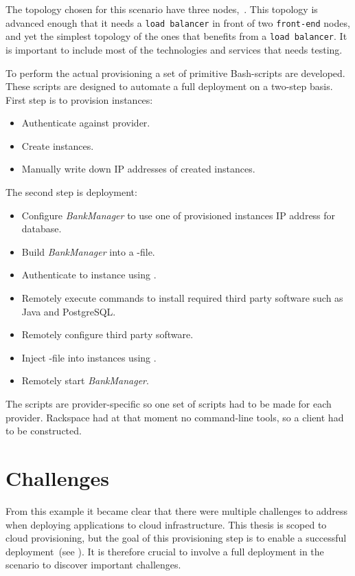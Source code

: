 The topology chosen for this scenario have three nodes,~.
This topology is advanced enough that it needs a \texttt{load balancer} in front of two
\texttt{front-end} nodes, and yet the simplest topology of the ones that benefits from a \texttt{load balancer}.
It is important to include most of the technologies and services that needs testing.

To perform the actual provisioning a set of primitive Bash-scripts are developed.
These scripts are designed to automate a full deployment on a two-step basis.
First step is to provision instances:
\begin{itemize}
  \item Authenticate against provider.
  \item Create instances.
  \item Manually write down IP addresses of created instances.
\end{itemize}
The second step is deployment:
\begin{itemize}
  \item Configure \emph{BankManager} to use one of provisioned instances IP address for database.
  \item Build \emph{BankManager} into a -file.
  \item Authenticate to instance using .
  \item Remotely execute commands to install required third party software such as Java and PostgreSQL.
  \item Remotely configure third party software.
  \item Inject -file into instances using .
  \item Remotely start \emph{BankManager}.
\end{itemize}
The scripts are provider-specific so one set of scripts had to be made for each provider.
Rackspace had at that moment no command-line tools, so a  client had to be constructed.

\section{Challenges}

From this example it became clear that there were multiple challenges to address
when deploying applications to cloud infrastructure.
This thesis is scoped to cloud provisioning, but the goal of this provisioning step is to 
enable a successful deployment~(see ).
It is therefore crucial to involve a full deployment in the scenario to discover
important challenges.

